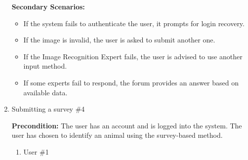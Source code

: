 \documentclass[]{article}
\begin{document}
\begin{enumerate}[{\bf BE1.}]
\noindent \textbf{Secondary Scenarios:}
\begin{itemize}
    \item If the system fails to authenticate the user, it prompts for login recovery.
    \item If the image is invalid, the user is asked to submit another one.
    \item If the Image Recognition Expert fails, the user is advised to use another input method.
    \item If some experts fail to respond, the forum provides an answer based on available data.
\end{itemize}

\item Submitting a survey \#4

\textbf{Precondition:} The user has an account and is logged into the system. The user has chosen to identify an animal using the survey-based method.

\begin{enumerate}[{\bf VP1.}]
    \item User \#1 \\


\end{enumerate}
\end{enumerate}
\end{document}

